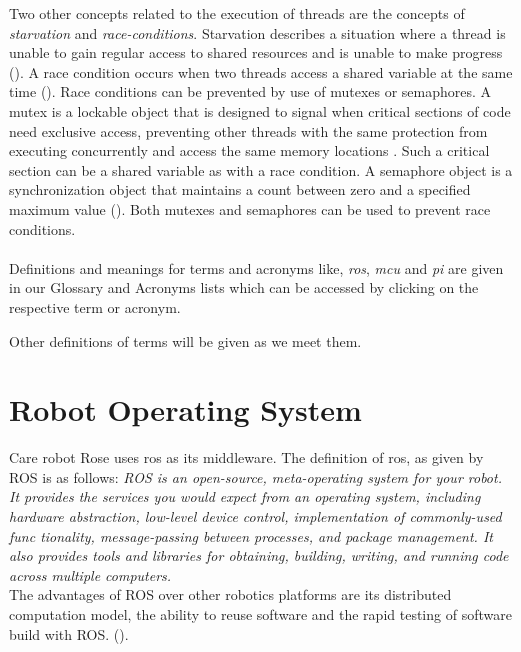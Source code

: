 \documentclass[12pt]{scrreprt}
\begin{document}
\par
Two other concepts related to the execution of threads are the concepts of \textit{starvation} and \textit{race-conditions}. Starvation describes a situation where a thread is unable to gain regular access to shared resources and is unable to make progress (\cite{livelock_starvation}). A race condition occurs when two threads access a shared variable at the same time (\cite{race_condition}). Race conditions can be prevented by use of mutexes or semaphores. A mutex is a lockable object that is designed to signal when critical sections of code need exclusive access, preventing other threads with the same protection from executing concurrently and access the same memory locations \cite{mutex}. Such a critical section can be a shared variable as with a race condition. A semaphore object is a synchronization object that maintains a count between zero and a specified maximum value (\cite{semaphore}). Both mutexes and semaphores can be used to prevent race conditions.
\\\\
Definitions and meanings for terms and acronyms like, \textit{\acrshort{ros}}, \textit{\acrshort{mcu}} and \textit{\acrshort{pi}} are given in our Glossary and Acronyms lists which can be accessed by clicking on the respective term or acronym.
\par
Other definitions of terms will be given as we meet them.
    

\section{Robot Operating System}
\label{tROS}
Care robot Rose uses \acrfull{ros} as its middleware. The definition of \acrfull{ros}, as given by ROS \cite{ros_wiki_introducton} is as follows:
\textit{ROS is an open-source, meta-operating system for your robot. It provides the services you would expect from an operating system, including hardware abstraction, low-level device control, implementation of commonly-used func tionality, message-passing between processes, and package management. It also provides tools and libraries for obtaining, building, writing, and running code across multiple computers.}\\
 The advantages of ROS over other robotics platforms are its distributed computation model, the ability to reuse software and the rapid testing of software build with ROS. (\cite{agitr}).
 
\end{document}
